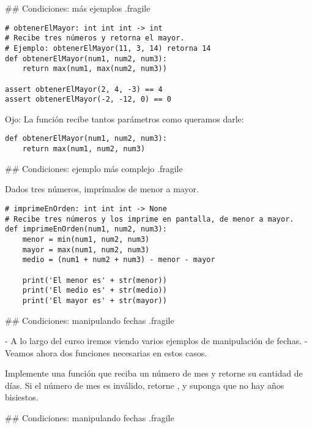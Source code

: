 ## Condiciones: más ejemplos {.fragile}


\begin{lstlisting}[style=frame02]
# obtenerElMayor: int int int -> int
# Recibe tres números y retorna el mayor.
# Ejemplo: obtenerElMayor(11, 3, 14) retorna 14
def obtenerElMayor(num1, num2, num3):
    return max(num1, max(num2, num3))

assert obtenerElMayor(2, 4, -3) == 4
assert obtenerElMayor(-2, -12, 0) == 0
\end{lstlisting}

\pause

\bgnblockidea
Ojo: La función  recibe tantos parámetros como queramos darle:
\trmblockidea

\begin{lstlisting}[style=frame02]
def obtenerElMayor(num1, num2, num3):
    return max(num1, num2, num3)
\end{lstlisting}

## Condiciones: ejemplo más complejo {.fragile}

\bgnblockgood
Dados tres números, imprímalos de menor a mayor.
\trmblockgood

\pause

\begin{lstlisting}[style=frame02]
# imprimeEnOrden: int int int -> None
# Recibe tres números y los imprime en pantalla, de menor a mayor.
def imprimeEnOrden(num1, num2, num3):
    menor = min(num1, num2, num3)
    mayor = max(num1, num2, num3)
    medio = (num1 + num2 + num3) - menor - mayor

    print('El menor es' + str(menor))
    print('El medio es' + str(medio))
    print('El mayor es' + str(mayor))
\end{lstlisting}

## Condiciones: manipulando fechas {.fragile}

- A lo largo del curso iremos viendo varios ejemplos de manipulación de fechas.
- Veamos ahora dos funciones necesarias en estos casos.

\vfill

\bgnblockgood
Implemente una función que reciba un número de mes y retorne su cantidad de días.\newline
Si el número de mes es inválido, retorne , y suponga que no hay años bisiestos.
\trmblockgood

## Condiciones: manipulando fechas {.fragile}

